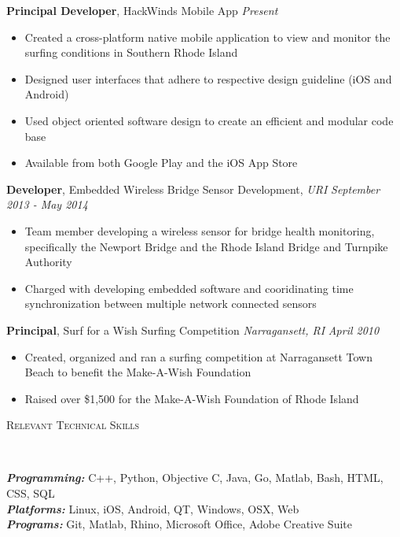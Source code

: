 \documentclass[10pt]{article}
\newenvironment{changemargin}[2]{%
  \begin{list}{}{%
    \setlength{\topsep}{0pt}%
    \setlength{\leftmargin}{#1}%
    \setlength{\rightmargin}{#2}%
    \setlength{\listparindent}{\parindent}%
    \setlength{\itemindent}{\parindent}%
    \setlength{\parsep}{\parskip}%
  }%
  \item[]}{\end{list}
}
\newcommand{\lineover}{
	\begin{changemargin}{-0.05in}{-0.05in}
		\vspace*{-8pt}
		\hrulefill \\
		\vspace*{-2pt}
	\end{changemargin}
}
\newcommand{\header}[1]{
	\begin{changemargin}{-0.5in}{-0.5in}
		\scshape{#1}\\
  	\lineover
	\end{changemargin}
}
\newenvironment{body} {
	\vspace*{-16pt}
	\begin{changemargin}{-0.25in}{-0.5in}
  }
	{\end{changemargin}
}
\begin{document}
\begin{body}
	\vspace{14pt}
	\smallskip
	\textbf{Principal Developer}, HackWinds Mobile App \hfill \emph{Present}\\
	\vspace*{-4pt}
	\begin{itemize} \itemsep -0pt
		\item Created a cross-platform native mobile application to view and monitor the surfing conditions in Southern Rhode Island
		\item Designed user interfaces that adhere to respective design guideline (iOS and Android)
		\item Used object oriented software design to create an efficient and modular code base
		\item Available from both Google Play and the iOS App Store
	\end{itemize}
 
	\textbf{Developer}, Embedded Wireless Bridge Sensor Development, \textit{URI} \hfill \emph{September 2013 - May 2014}\\
	\vspace*{-4pt}
	\begin{itemize} \itemsep -0pt
		\item Team member developing a wireless sensor for bridge health monitoring, specifically the Newport Bridge and the Rhode Island Bridge and Turnpike Authority
		\item Charged with developing embedded software and cooridinating time synchronization between multiple network connected sensors
	\end{itemize}
 
	\textbf{Principal}, Surf for a Wish Surfing Competition \textit{Narragansett, RI} \hfill \emph{April 2010}\\
	\vspace*{-4pt}
	\begin{itemize} \itemsep -0pt
		\item Created, organized and ran a surfing competition at Narragansett Town Beach to benefit the Make-A-Wish Foundation
		\item Raised over \$1,500 for the Make-A-Wish Foundation of Rhode Island
	\end{itemize}
\end{body}
 
\smallskip
 
\header{Relevant Technical Skills}
 
\begin{body}
	\vspace{14pt}
	\emph{\textbf{Programming:}}{} C++, Python, Objective C, Java, Go, Matlab, Bash, HTML, CSS, SQL  \\
	\medskip
	\emph{\textbf{Platforms:}}{} Linux, iOS, Android, QT, Windows, OSX, Web \\
	\medskip
	\emph{\textbf{Programs:}}{} Git, Matlab, Rhino, Microsoft Office, Adobe Creative Suite \\
\end{body}
 
\smallskip
 
\end{document}
